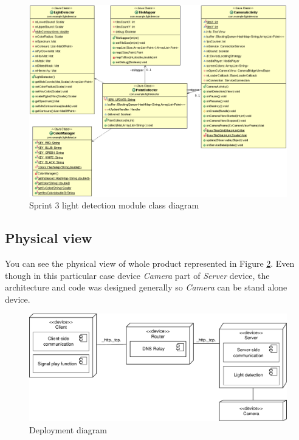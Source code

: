 \begin{figure}[H]
	\centering
		\includegraphics[width=16.2cm]{sprint3/sprint3.png}
	\caption{Sprint 3 light detection module class diagram}
	\label{fig:class_diagram_sprint3}
\end{figure}

\subsection{Physical view}
You can see the physical view of whole product represented in Figure \ref{fig:sprint3_deployment_diagram}.
Even though in this particular case device \emph{Camera} part of \emph{Server} device, the architecture and code was designed generally so \emph{Camera} can be stand alone device.

\begin{figure}[H]
	\centering
		\includegraphics[width=15cm]{images/deployment-diagram-sprint3}
	\caption{Deployment diagram}
	\label{fig:sprint3_deployment_diagram}
\end{figure}

